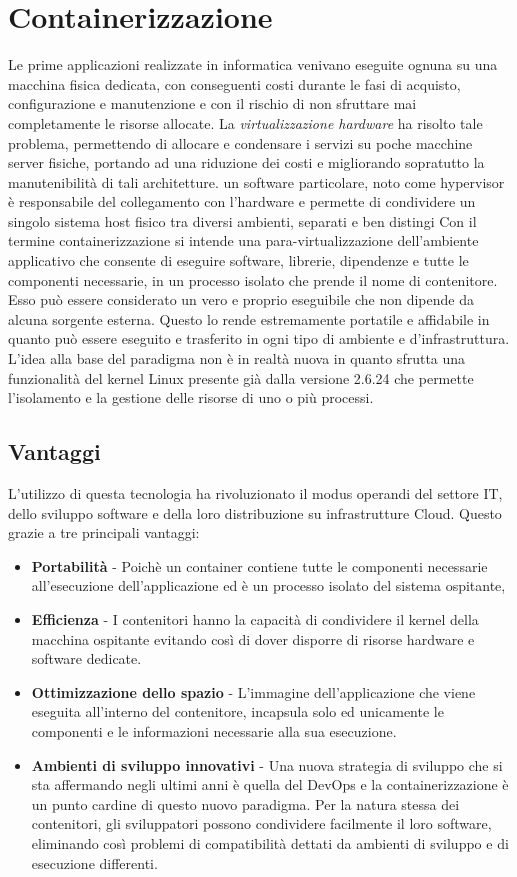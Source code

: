 
\section{Containerizzazione}
Le prime applicazioni realizzate in informatica venivano eseguite ognuna su una macchina fisica dedicata, con conseguenti costi durante le fasi di acquisto, configurazione e manutenzione e con il rischio di non sfruttare mai completamente le risorse allocate.
La \textit{virtualizzazione hardware} ha risolto tale problema, permettendo di allocare e condensare i servizi su poche macchine server fisiche, portando ad una riduzione dei costi e migliorando sopratutto la manutenibilità di tali architetture. un software particolare, noto come hypervisor è responsabile del collegamento con l'hardware e permette di condividere un singolo sistema host fisico tra diversi ambienti, separati e ben distingi  
Con il termine containerizzazione si intende una para-virtualizzazione dell'ambiente applicativo che consente di eseguire software, librerie, dipendenze e tutte le componenti necessarie, in un processo isolato che prende il nome di contenitore. Esso può essere considerato un vero e proprio eseguibile che non dipende da alcuna sorgente esterna. Questo lo rende estremamente portatile e affidabile in quanto può essere eseguito e trasferito in ogni tipo di ambiente e d'infrastruttura.
L'idea alla base del paradigma non è in realtà nuova in quanto sfrutta una funzionalità del kernel Linux presente già dalla versione 2.6.24 che permette l'isolamento e la gestione delle risorse di uno o più processi.

\subsection{Vantaggi}
L'utilizzo di questa tecnologia ha rivoluzionato il modus operandi del settore IT, dello sviluppo software e della loro distribuzione su infrastrutture Cloud. Questo grazie a tre principali vantaggi:
\begin{itemize}
\item \textbf{Portabilità} - Poichè un container contiene tutte le componenti necessarie all'esecuzione dell'applicazione ed è un processo isolato del sistema ospitante, 
\item \textbf{Efficienza} - I contenitori hanno la capacità di condividere il kernel della macchina ospitante evitando così di dover disporre di risorse hardware e software dedicate.
\item \textbf{Ottimizzazione dello spazio} - L'immagine dell'applicazione che viene eseguita all'interno del contenitore, incapsula solo ed unicamente le componenti e le informazioni necessarie alla sua esecuzione.
\item \textbf{Ambienti di sviluppo innovativi} - Una nuova strategia di sviluppo che si sta affermando negli ultimi anni è quella del DevOps e la containerizzazione è un punto cardine di questo nuovo paradigma. Per la natura stessa dei contenitori, gli sviluppatori possono condividere facilmente il loro software, eliminando così problemi di compatibilità dettati da ambienti di sviluppo e di esecuzione differenti. 
\end{itemize}

